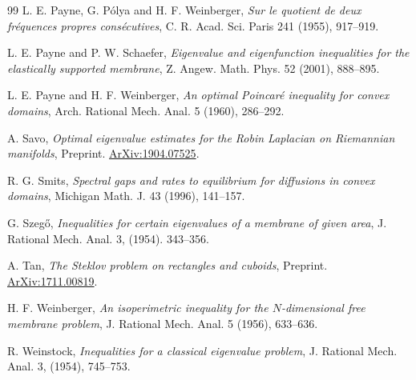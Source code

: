 \documentclass[12pt,reqno]{amsart}
\theoremstyle{definition}
\newcommand{\arxiv}[1]{%
 \href{http://front.math.ucdavis.edu/#1}{ArXiv:#1}}
\begin{document}
\begin{thebibliography}{99}
L. E. Payne, G. P\'{o}lya and H. F. Weinberger, \emph{Sur le quotient de deux fr\'{e}quences propres cons\'{e}cutives}, C. R. Acad. Sci. Paris 241 (1955), 917--919. 

L. E. Payne and P. W. Schaefer, \emph{Eigenvalue and eigenfunction inequalities for the elastically supported membrane}, Z. Angew. Math. Phys. 52 (2001), 888--895.

L. E. Payne and H. F. Weinberger, \emph{An optimal Poincar\'{e} inequality for convex domains}, Arch. Rational Mech. Anal. 5 (1960), 286--292.

A. Savo, \emph{Optimal eigenvalue estimates for the Robin Laplacian on Riemannian manifolds}, Preprint. \arxiv{1904.07525}.

R. G. Smits, \emph{Spectral gaps and rates to equilibrium for diffusions in convex domains}, Michigan Math. J. 43 (1996), 141--157.

G. Szeg\H{o}, \emph{Inequalities for certain eigenvalues of a membrane of given area},  
J. Rational Mech. Anal. 3, (1954). 343--356.

A. Tan, \emph{The Steklov problem on rectangles and cuboids}, Preprint. \arxiv{1711.00819}.

H. F. Weinberger, \emph{An isoperimetric inequality for the $N$-dimensional free membrane problem}, J. Rational Mech. Anal. 5 (1956), 633--636.

R. Weinstock, \emph{Inequalities for a classical eigenvalue problem}, J. Rational Mech. Anal. 3, (1954), 745--753. 
\end{thebibliography} 
\end{document}
